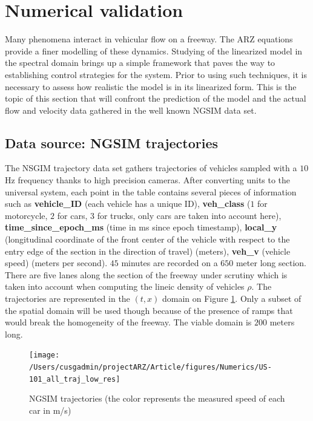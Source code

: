 \documentclass[preprint]{elsarticle}
\begin{document}
\section{Numerical validation}

Many phenomena interact in vehicular flow on a freeway. The ARZ equations
provide a finer modelling of these dynamics. Studying of the linearized
model in the spectral domain brings up a simple framework that paves
the way to establishing control strategies for the system. Prior to
using such techniques, it is necessary to assess how realistic the
model is in its linearized form. This is the topic of this section
that will confront the prediction of the model and the actual flow
and velocity data gathered in the well known NGSIM data set.


\subsection{Data source: NGSIM trajectories}

The NSGIM trajectory data set gathers trajectories of vehicles sampled
with a $10$ Hz frequency thanks to high precision cameras. After
converting units to the universal system, each point in the table
contains several pieces of information such as \textbf{vehicle\_ID}
(each vehicle has a unique ID), \textbf{veh\_class }($1$ for motorcycle,
$2$ for cars, $3$ for trucks, only cars are taken into account here),
\textbf{time\_since\_epoch\_ms} (time in ms since epoch timestamp),
\textbf{local\_y} (longitudinal coordinate of the front center of
the vehicle with respect to the entry edge of the section in the direction
of travel) (meters), \textbf{veh\_v} (vehicle speed) (meters per second).
$45$ minutes are recorded on a $650$ meter long section. There are
five lanes along the section of the freeway under scrutiny which is
taken into account when computing the lineic density of vehicles $\rho$\@.
The trajectories are represented in the $\left(t,x\right)$ domain
on Figure \ref{fig:NGSIM-trajectories}.
Only a subset of the spatial domain will be used though because of the presence of ramps that would break the homogeneity of the freeway. The viable domain is $200$ meters long.

\begin{figure}
\begin{centering}
\texttt{[image: /Users/cusgadmin/projectARZ/Article/figures/Numerics/US-101\_all\_traj\_low\_res]}
\par\end{centering}

\protect\caption{NGSIM trajectories (the color represents the measured speed of each
car in m/s)\label{fig:NGSIM-trajectories}}
\end{figure}
\end{document}
